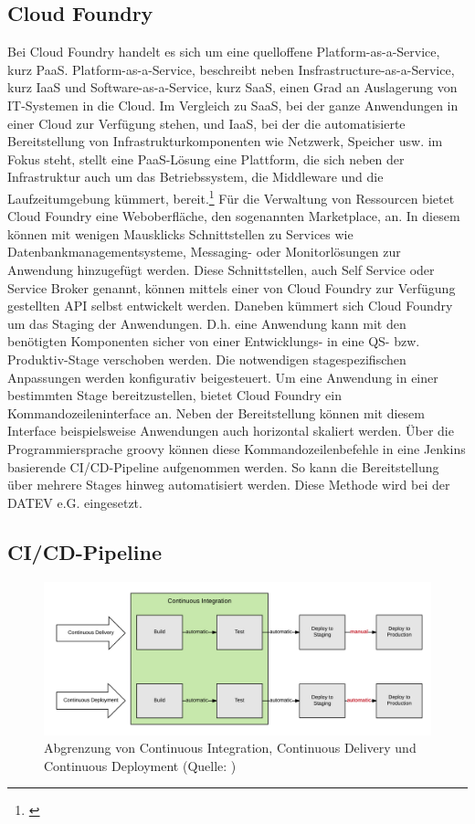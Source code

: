 \subsection{\glqq Cloud Foundry\grqq}\label{ssec:cloudfoundry}
Bei Cloud Foundry handelt es sich um eine quelloffene Platform-as-a-Service, kurz PaaS.
Platform-as-a-Service, beschreibt neben Insfrastructure-as-a-Service, kurz IaaS und Software-as-a-Service, kurz SaaS, einen Grad an Auslagerung von IT-Systemen in die Cloud.
Im Vergleich zu SaaS, bei der ganze Anwendungen in einer Cloud zur Verfügung stehen, und IaaS, bei der die automatisierte Bereitstellung von Infrastrukturkomponenten wie Netzwerk, Speicher usw. im Fokus steht, stellt eine PaaS-Lösung eine Plattform, die sich neben der Infrastruktur auch um das Betriebssystem, die Middleware und die Laufzeitumgebung kümmert, bereit.\footnote{\cite{.25.2.2020}}
Für die Verwaltung von Ressourcen bietet Cloud Foundry eine Weboberfläche, den sogenannten \glqq Marketplace\grqq, an.
In diesem können mit wenigen Mausklicks Schnittstellen zu Services wie Datenbankmanagementsysteme, Messaging- oder Monitorlösungen zur Anwendung hinzugefügt werden.
Diese Schnittstellen, auch \glqq Self Service\grqq{} oder \glqq Service Broker\grqq{} genannt, können mittels einer von Cloud Foundry zur Verfügung gestellten API selbst entwickelt werden.
Daneben kümmert sich Cloud Foundry um das Staging der Anwendungen.
D.h. eine Anwendung kann mit den benötigten Komponenten sicher von einer Entwicklungs- in eine QS- bzw. Produktiv-Stage verschoben werden. 
Die notwendigen stagespezifischen Anpassungen werden konfigurativ beigesteuert.
Um eine Anwendung in einer bestimmten Stage bereitzustellen, bietet Cloud Foundry ein Kommandozeileninterface an.
Neben der Bereitstellung können mit diesem Interface beispielsweise Anwendungen auch horizontal skaliert werden.
Über die Programmiersprache groovy können diese Kommandozeilenbefehle in eine Jenkins basierende CI/CD-Pipeline aufgenommen werden.
So kann die Bereitstellung über mehrere Stages hinweg automatisiert werden.
Diese Methode wird bei der DATEV e.G. eingesetzt.
\cite{.23.2.2020c}

\subsection{\glqq CI/CD-Pipeline\grqq}\label{sec:cicd}
\begin{figure}[h]
	\centering
	\includegraphics[width=\textwidth]{figures/ci-cd-flow-desktop_1.png}
	\caption{Abgrenzung von Continuous Integration, Continuous Delivery und Continuous Deployment  (Quelle: \cite{.25.2.2020d})}
	\label{fig:cicd}
\end{figure}

